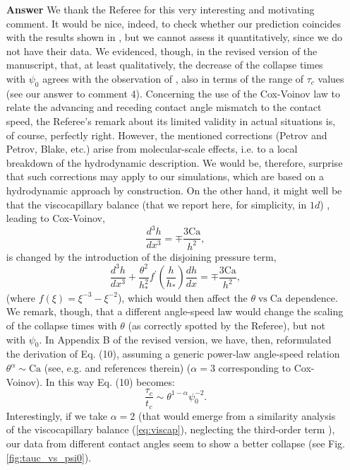 \documentclass[12pt,english]{article}
\begin{document}
\begin{itemize}
\item[ \textbf{{Answer}}]{
We thank the Referee for this very interesting and motivating comment. It would be 
nice, indeed, to check whether our prediction coincides with the results shown in \cite{gonzalezStabilityLiquidRing2013}, but we cannot assess it quantitatively, since 
we do not have their data. We evidenced, though, in the revised version of the manuscript, that, at least qualitatively, the decrease of the collapse times with $\psi_0$  agrees with the observation of \cite{gonzalezStabilityLiquidRing2013}, also in terms of the range of $\tau_c$ values (see our answer to comment 4).
Concerning the use of the Cox-Voinov law to relate the advancing and receding contact 
angle mismatch to the contact speed, the Referee's remark about its limited 
validity in actual situations is, of course, perfectly right. However, the mentioned corrections (Petrov and Petrov, Blake, etc.) arise from molecular-scale effects, i.e. to a local breakdown of the hydrodynamic description. We would be, therefore, surprise
that such corrections may apply to our simulations, which are based on a hydrodynamic 
approach by construction. On the other hand, it might well be that the viscocapillary balance (that we report here, for simplicity, in $1d$) \cite{SnoeijerARFM2013}, leading to Cox-Voinov, 
$$
\frac{d^3h}{dx^3} = \mp\frac{3\text{Ca}}{h^2},
$$
is changed by the introduction of the disjoining pressure term, 
\begin{equation}\label{eq:viscap}
\frac{d^3h}{dx^3} +\frac{\theta^2}{h_{\ast}^2}f^{\prime}\left(\frac{h}{h_{\ast}}\right)\frac{dh}{dx} = \mp\frac{3\text{Ca}}{h^2},
\end{equation}
(where $f(\xi) = \xi^{-3}-\xi^{-2}$), 
which would then affect the $\theta \; \text{vs} \; \text{Ca}$ dependence. 
We remark, though, that a different angle-speed law would change the scaling of the collapse times with $\theta$ (as correctly spotted by the 
Referee), but not with $\psi_0$. 
In Appendix B of the revised version, we have, then, reformulated the derivation of
Eq. (10), assuming a generic power-law angle-speed relation 
$\theta^{\alpha} \sim \text{Ca}$ (see, e.g. \cite{Popescu2012} and references therein)
($\alpha =3$ corresponding to Cox-Voinov). In this way Eq. (10) becomes:
\begin{equation}\label{eq:tauctheo}
\frac{\tau_c}{t_c} \sim \theta^{1-\alpha} \psi_0^{-2}.
\end{equation}
Interestingly, if we take $\alpha = 2$ (that would emerge from a similarity analysis 
of the viscocapillary balance (\ref{eq:viscap}), neglecting the third-order term \cite{Popescu2012}), our data from different contact angles seem to show a better collapse (see Fig. \ref{fig:tauc_vs_psi0}).
}
\end{itemize}
\end{document}

